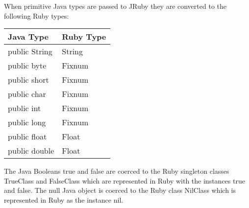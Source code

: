 When primitive Java types are passed to JRuby they are converted to the following Ruby types:

\begin{tabular}{l l}
  Java Type & Ruby Type \\
  \toprule
  public String & String \\
  public byte & Fixnum \\
  public short & Fixnum \\
  public char & Fixnum \\
  public int & Fixnum \\
  public long & Fixnum \\
  public float & Float \\
  public double & Float
\end{tabular}

The Java Booleans true and false are coerced to the Ruby singleton classes TrueClass and FalseClass
which are represented in Ruby with the instances true and false.
The null Java object is coerced to the Ruby class NilClass which is represented in Ruby as the instance nil.
